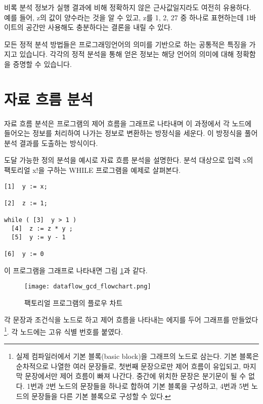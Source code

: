\documentclass[a4paper]{book}
\begin{document}
비록 분석 정보가 실행 결과에 비해 정확하지 않은 근사값일지라도 여전히
유용하다.  예를 들어, z의 값이 양수라는 것을 알 수 있고, z를 1, 2, 27
중 하나로 표현하는데 1바이트의 공간만 사용해도 충분하다는 결론을 내릴
수 있다.

모든 정적 분석 방법들은 프로그래밍언어의 의미를 기반으로 하는 공통적은
특징을 가지고 있습니다. 각각의 정적 분석을 통해 얻은 정보는 해당
언어의 의미에 대해 정확함을 증명할 수 있습니다.

\section{자료 흐름 분석}

자료 흐름 분석은 프로그램의 제어 흐름을 그래프로 나타내며 이 과정에서
각 노드에 들어오는 정보를 처리하여 나가는 정보로 변환하는 방정식을
세운다. 이 방정식을 풀어 분석 결과를 도출하는 방식이다.

도달 가능한 정의 분석을 예시로 자료 흐름 분석을 설명한다.
%
분석 대상으로 입력 x의 팩토리얼 x!을 구하는 WHILE 프로그램을 예제로 살펴본다.

\begin{center}
\begin{minipage}[h]{.7\textwidth}
  \begin{lstlisting}
[1]  y := x;

[2]  z := 1;

while ( [3]  y > 1 )
  [4]  z := z * y ;
  [5]  y := y - 1

[6]  y := 0
  \end{lstlisting}
\end{minipage}
\end{center}

이 프로그램을 그래프로 나타내면 그림
\ref{fig:dataflow_gcd_flowchart}과 같다. 

\begin{figure}[ht]
\begin{center}
  \texttt{[image: dataflow\_gcd\_flowchart.png]}
\end{center}
\caption{팩토리얼 프로그램의 플로우 차트}
\label{fig:dataflow_gcd_flowchart}
\end{figure}

각 문장과 조건식을 노드로 하고 제어 흐름을 나타내는 에지를 두어
그래프를 만들었다\footnote{실제 컴파일러에서 기본 블록(basic block)을
그래프의 노드로 삼는다.
%
기본 블록은 순차적으로 나열한 여러 문장들로, 첫번째 문장으로만 제어
흐름이 유입되고, 마지막 문장에서만 제어 흐름이 빠져 나간다. 중간에
위치한 문장은 분기문이 될 수 없다.
%
1번과 2번 노드의 문장들을 하나로 합하여 기본 블록을 구성하고, 4번과
5번 노드의 문장들을 다른 기본 블록으로 구성할 수 있다.}.
%
각 노드에는 고유 식별 번호를 붙였다.
\end{document}
